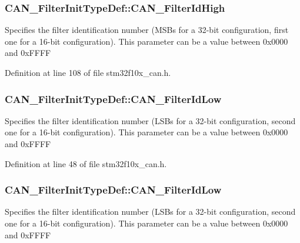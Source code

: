 \subsubsection[{\texorpdfstring{C\+A\+N\+\_\+\+Filter\+Id\+High}{CAN_FilterIdHigh}}]{ C\+A\+N\+\_\+\+Filter\+Init\+Type\+Def\+::\+C\+A\+N\+\_\+\+Filter\+Id\+High}\hypertarget{struct_c_a_n___filter_init_type_def_afc109aa8eedced09d296605f2eb871f7}{}\label{struct_c_a_n___filter_init_type_def_afc109aa8eedced09d296605f2eb871f7}
Specifies the filter identification number (M\+S\+Bs for a 32-\/bit configuration, first one for a 16-\/bit configuration). This parameter can be a value between 0x0000 and 0x\+F\+F\+FF 

Definition at line 108 of file stm32f10x\+\_\+can.\+h.

\subsubsection[{\texorpdfstring{C\+A\+N\+\_\+\+Filter\+Id\+Low}{CAN_FilterIdLow}}]{ C\+A\+N\+\_\+\+Filter\+Init\+Type\+Def\+::\+C\+A\+N\+\_\+\+Filter\+Id\+Low}\hypertarget{struct_c_a_n___filter_init_type_def_a1f0928f446f1a67acaad4244dc737330}{}\label{struct_c_a_n___filter_init_type_def_a1f0928f446f1a67acaad4244dc737330}
Specifies the filter identification number (L\+S\+Bs for a 32-\/bit configuration, second one for a 16-\/bit configuration). This parameter can be a value between 0x0000 and 0x\+F\+F\+FF 

Definition at line 48 of file stm32f10x\+\_\+can.\+h.

\subsubsection[{\texorpdfstring{C\+A\+N\+\_\+\+Filter\+Id\+Low}{CAN_FilterIdLow}}]{ C\+A\+N\+\_\+\+Filter\+Init\+Type\+Def\+::\+C\+A\+N\+\_\+\+Filter\+Id\+Low}\hypertarget{struct_c_a_n___filter_init_type_def_ab8c56b48ac323e8c7a1b535c79a51f87}{}\label{struct_c_a_n___filter_init_type_def_ab8c56b48ac323e8c7a1b535c79a51f87}
Specifies the filter identification number (L\+S\+Bs for a 32-\/bit configuration, second one for a 16-\/bit configuration). This parameter can be a value between 0x0000 and 0x\+F\+F\+FF 

